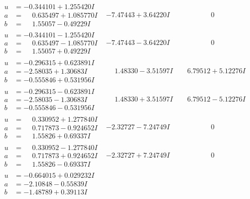 \documentclass[1p]{elsarticle_modified}
\theoremstyle{definition}
\begin{document}
$$\begin{array}{c|c|c}
\begin{aligned}
u &= -0.344101 + 1.255420 I \\
a &= \phantom{-}0.635497 + 1.085770 I \\
b &= \phantom{-}1.55057 - 0.49229 I\end{aligned}
 & -7.47443 + 3.64220 I & \phantom{-0.000000 } 0 \\ \hline\begin{aligned}
u &= -0.344101 - 1.255420 I \\
a &= \phantom{-}0.635497 - 1.085770 I \\
b &= \phantom{-}1.55057 + 0.49229 I\end{aligned}
 & -7.47443 - 3.64220 I & \phantom{-0.000000 } 0 \\ \hline\begin{aligned}
u &= -0.296315 + 0.623891 I \\
a &= -2.58035 + 1.30683 I \\
b &= -0.555846 + 0.531956 I\end{aligned}
 & \phantom{-}1.48330 - 3.51597 I & \phantom{-}6.79512 + 5.12276 I \\ \hline\begin{aligned}
u &= -0.296315 - 0.623891 I \\
a &= -2.58035 - 1.30683 I \\
b &= -0.555846 - 0.531956 I\end{aligned}
 & \phantom{-}1.48330 + 3.51597 I & \phantom{-}6.79512 - 5.12276 I \\ \hline\begin{aligned}
u &= \phantom{-}0.330952 + 1.277840 I \\
a &= \phantom{-}0.717873 - 0.924652 I \\
b &= \phantom{-}1.55826 + 0.69337 I\end{aligned}
 & -2.32727 - 7.24749 I & \phantom{-0.000000 } 0 \\ \hline\begin{aligned}
u &= \phantom{-}0.330952 - 1.277840 I \\
a &= \phantom{-}0.717873 + 0.924652 I \\
b &= \phantom{-}1.55826 - 0.69337 I\end{aligned}
 & -2.32727 + 7.24749 I & \phantom{-0.000000 } 0 \\ \hline\begin{aligned}
u &= -0.664015 + 0.029232 I \\
a &= -2.10848 - 0.55839 I \\
b &= -1.48789 + 0.39113 I\end{aligned}

\end{array}$$
\end{document}
